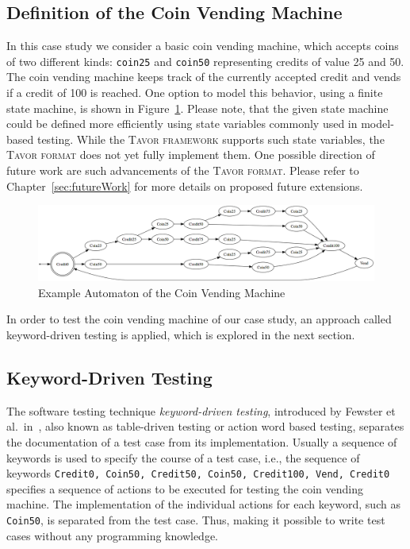 \subsection{Definition of the Coin Vending Machine}
\label{subsec:coinVendingMachineDefinition}

In this case study we consider a basic coin vending machine, which accepts coins of two different kinds: \texttt{coin25} and \texttt{coin50} representing credits of value 25 and 50. The coin vending machine keeps track of the currently accepted credit and vends if a credit of 100 is reached. One option to model this behavior, using a finite state machine, is shown in Figure~\ref{fig:coinVendingMachine}. Please note, that the given state machine could be defined more efficiently using state variables commonly used in model-based testing. While the \textsc{Tavor framework} supports such state variables, the \textsc{Tavor format} does not yet fully implement them. One possible direction of future work are such advancements of the \textsc{Tavor format}. Please refer to Chapter~\ref{sec:futureWork} for more details on proposed future extensions.

\begin{figure}[t]
\hspace*{-1.5cm}\includegraphics[width=1.1\textwidth]{images/evaluation-coin-vending.png}
\caption{Example Automaton of the Coin Vending Machine}
\label{fig:coinVendingMachine}
\end{figure}

In order to test the coin vending machine of our case study, an approach called keyword-driven testing is applied, which is explored in the next section.

\subsection{Keyword-Driven Testing}
\label{subsec:coinVendingMachineKeywordDriven}

The software testing technique \emph{keyword-driven testing}, introduced by Fewster et al.~in~\cite{fewster1999software}, also known as table-driven testing or action word based testing, separates the documentation of a test case from its implementation. Usually a sequence of keywords is used to specify the course of a test case, i.e., the sequence of keywords \texttt{Credit0, Coin50, Credit50, Coin50, Credit100, Vend, Credit0} specifies a sequence of actions to be executed for testing the coin vending machine. The implementation of the individual actions for each keyword, such as \texttt{Coin50}, is separated from the test case. Thus, making it possible to write test cases without any programming knowledge.

